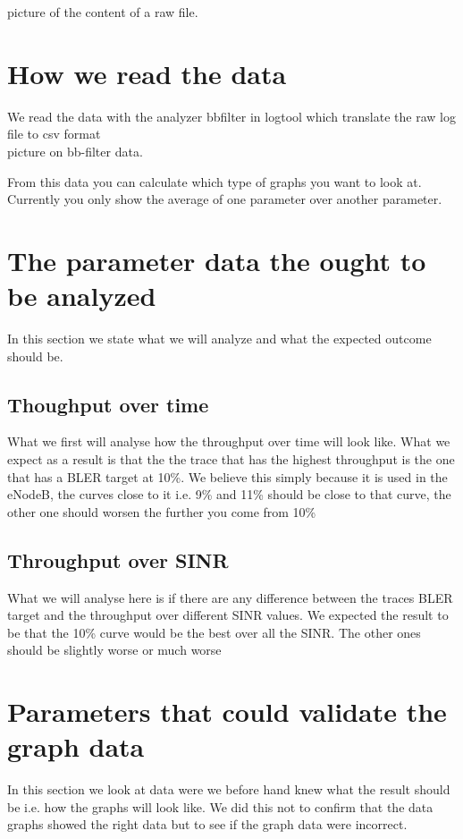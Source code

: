 \documentclass[cropmarks, frame, english]{idamasterthesis}
\begin{document}
picture of the content of a raw file.

\section{How we read the data}
We read the data with the analyzer bbfilter in logtool which translate the raw log file to csv format\\

picture on bb-filter data.

From this data you can calculate which type of graphs you want to look at. Currently you only show the average of one parameter over another parameter.







\section{The parameter data the ought to be analyzed}
In this section we state what we will analyze and what the expected outcome should be.

\subsection{Thoughput over time}
What we first will analyse how the throughput over time will look like. What we expect as a result  is that the the trace that has the highest throughput is the one that has a BLER target at 10\%. We believe this simply because it is used in the eNodeB, the curves close to it i.e. 9\% and 11\% should be close to that curve, the other one should worsen the further you come from 10\%

\subsection{Throughput over SINR}
What we will analyse here is if there are any difference between the traces BLER target and the  throughput over different SINR values. We expected the result to be that the 10\% curve would be the best over all the SINR. The other ones should be slightly worse or much worse

\section{Parameters that could validate the graph data}
In this section we look at data were we before hand knew what the result should be i.e. how the graphs will look like. We did this not to confirm that the data graphs showed the right data but to see if the graph data were incorrect.
\end{document}
